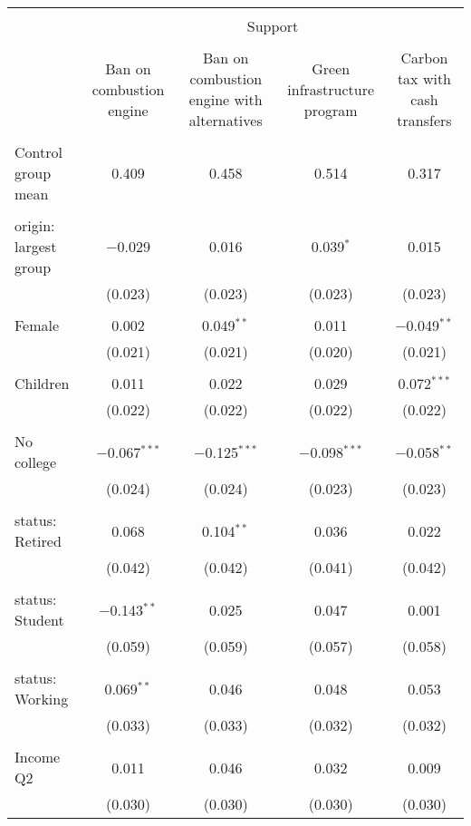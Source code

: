 
\begin{tabular}{@{\extracolsep{5pt}}lcccc} 
\\[-1.8ex]\hline 
\hline \\[-1.8ex] 
 & \multicolumn{4}{c}{Support} \\ 
\cline{2-5} 
\\[-1.8ex] & Ban on combustion engine & Ban on combustion engine with alternatives & Green infrastructure program & Carbon tax with cash transfers \\ 
\hline \\[-1.8ex] 
 Control group mean & 0.409 & 0.458 & 0.514 & 0.317  \\ \hline \\[-1.8ex] origin: largest group & $-$0.029 & 0.016 & 0.039$^{*}$ & 0.015 \\ 
  & (0.023) & (0.023) & (0.023) & (0.023) \\ 
  & & & & \\ 
 Female & 0.002 & 0.049$^{**}$ & 0.011 & $-$0.049$^{**}$ \\ 
  & (0.021) & (0.021) & (0.020) & (0.021) \\ 
  & & & & \\ 
 Children & 0.011 & 0.022 & 0.029 & 0.072$^{***}$ \\ 
  & (0.022) & (0.022) & (0.022) & (0.022) \\ 
  & & & & \\ 
 No college & $-$0.067$^{***}$ & $-$0.125$^{***}$ & $-$0.098$^{***}$ & $-$0.058$^{**}$ \\ 
  & (0.024) & (0.024) & (0.023) & (0.023) \\ 
  & & & & \\ 
 status: Retired & 0.068 & 0.104$^{**}$ & 0.036 & 0.022 \\ 
  & (0.042) & (0.042) & (0.041) & (0.042) \\ 
  & & & & \\ 
 status: Student & $-$0.143$^{**}$ & 0.025 & 0.047 & 0.001 \\ 
  & (0.059) & (0.059) & (0.057) & (0.058) \\ 
  & & & & \\ 
 status: Working & 0.069$^{**}$ & 0.046 & 0.048 & 0.053 \\ 
  & (0.033) & (0.033) & (0.032) & (0.032) \\ 
  & & & & \\ 
 Income Q2 & 0.011 & 0.046 & 0.032 & 0.009 \\ 
  & (0.030) & (0.030) & (0.030) & (0.030) \\ 

\end{tabular}
